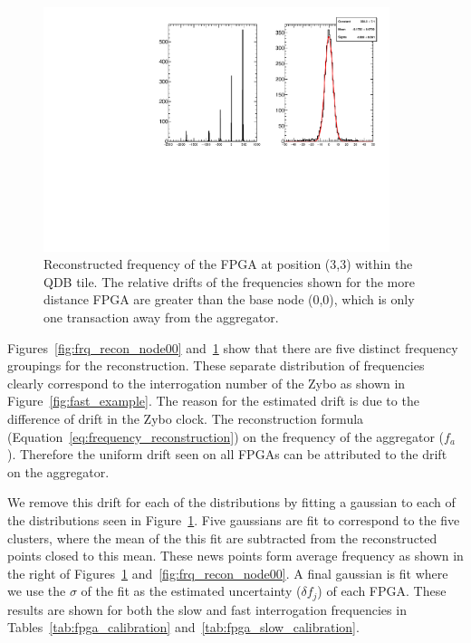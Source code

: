 \begin{figure}[]
\centering
\includegraphics[width=0.9\textwidth]{images/(3,3).pdf}
\caption{Reconstructed frequency of the FPGA at position (3,3) within the QDB tile.
The relative drifts of the frequencies shown for the more distance FPGA are greater than the base node (0,0), which is only one transaction away from the aggregator.
}
\label{fig:frq_recon_node33}
\end{figure}


Figures~\ref{fig:frq_recon_node00} and~\ref{fig:frq_recon_node33} show that there are five distinct frequency groupings for the reconstruction.
These separate distribution of frequencies clearly correspond to the interrogation number of the Zybo as shown in Figure~\ref{fig:fast_example}.
The reason for the estimated drift is due to the difference of drift in the Zybo clock.
The reconstruction formula (Equation~\ref{eq:frequency_reconstruction}) on the frequency of the aggregator ($f_{a}$).
Therefore the uniform drift seen on all FPGAs can be attributed to the drift on the aggregator.

We remove this drift for each of the distributions by fitting a gaussian to each of the distributions seen in Figure~\ref{fig:frq_recon_node33}.
Five gaussians are fit to correspond to the five clusters, where the mean of the this fit are subtracted from the reconstructed points closed to this mean.
These news points form average frequency as shown in the right of Figures~\ref{fig:frq_recon_node33} and~\ref{fig:frq_recon_node00}.
A final gaussian is fit where we use the $\sigma$ of the fit as the estimated uncertainty ($\delta f_{j}$) of each FPGA.
These results are shown for both the slow and fast interrogation frequencies in Tables~\ref{tab:fpga_calibration} and~\ref{tab:fpga_slow_calibration}.


